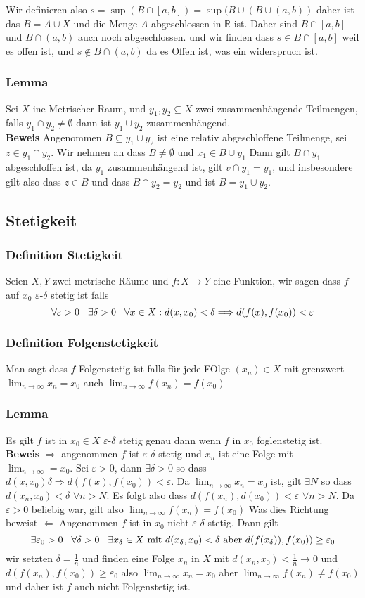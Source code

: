 \documentclass{article}
\newcommand{\smspc}{\hspace{0.3cm}}
\newcommand{\beweis}{\\\textbf{Beweis }}
\newcommand{\lemma}[1]{\subsubsection*{Lemma {#1}}}
\newcommand{\definition}[1]{\subsubsection*{Definition {#1}}}
\begin{document}
Wir definieren also $s=\sup(B\cap[a,b])=\sup(B\cup(B\cup(a,b))$ daher ist das $B=A\cup X$ und die Menge $A$ abgeschlossen in $\mathbb{R}$ ist. Daher sind $B\cap[a,b]$ und $B\cap (a,b)$ auch noch abgeschlossen. und wir finden dass $s\in B\cap [a,b]$ weil es offen ist, und $s\not\in B\cap(a,b)$ da es Offen ist, was ein widerspruch ist.
\lemma{} Sei $X$ ine Metrischer Raum, und $y_1,y_2\subseteq X$ zwei zusammenhängende Teilmengen, falls $y_1\cap y_2\neq\emptyset$ dann ist $y_1\cup y_2$ zusammenhängend.
\beweis Angenommen $B\subseteq y_1\cup y_2$ ist eine relativ abgeschloffene Teilmenge, sei $z\in y_1\cap y_2$. Wir nehmen an dass $B\neq \emptyset$ und $x_1\in B\cup y_1$ Dann gilt $B\cap y_1$ abgeschloffen ist, da $y_1$ zusammenhängend ist, gilt $v\cap y_1=y_1$, und insbesondere gilt also dass $z\in B$ und dass $B\cap y_2=y_2$ und ist $B=y_1\cup y_2$.
\subsection*{Stetigkeit}
\definition{Stetigkeit} Seien $X,Y$ zwei metrische Räume und $f:X\rightarrow Y$ eine Funktion, wir sagen dass $f$ auf $x_0$ $\varepsilon$-$\delta$ stetig ist falls \[\forall \varepsilon >0\smspc\exists \delta > 0\smspc\forall x\in X:d(x,x_0)<\delta\Longrightarrow d(f(x),f(x_0))<\varepsilon\]
\definition{Folgenstetigkeit} Man sagt dass $f$ Folgenstetig ist falls für jede FOlge $(x_n)\in X$ mit grenzwert $\lim_{n\rightarrow \infty} x_n=x_0$ auch $\lim_{n\rightarrow \infty} f(x_n)=f(x_0)$
\lemma{} Es gilt $f$ ist in $x_0\in X$ $\varepsilon$-$\delta$ stetig genau dann wenn $f$ in $x_0$ foglenstetig ist.
\beweis $\Longrightarrow$ angenommen $f$ ist $\varepsilon$-$\delta$ stetig und $x_n$ ist eine Folge mit $\lim_{n\rightarrow\infty}=x_0$. Sei $\varepsilon>0$, dann $\exists\delta >0$ so dass $d(x,x_0)\delta\Rightarrow d(f(x),f(x_0))<\varepsilon$. Da $\lim_{n\rightarrow\infty}x_n=x_0$ ist, gilt $\exists N$ so dass $d(x_n,x_0)<\delta$ $\forall n>N$. Es folgt also dass $d(f(x_n),d(x_0))< \varepsilon$ $\forall n>N$. Da $\varepsilon > 0$ beliebig war, gilt also $\lim_{n\rightarrow\infty}f(x_n)=f(x_0)$ Was dies Richtung beweist\newline
$\Longleftarrow$ Angenommen $f$ ist in $x_0$ nicht $\varepsilon$-$\delta$ stetig. Dann gilt \[\exists\varepsilon_0 >0\smspc\forall \delta >0\smspc \exists x_\delta \in X\text{ mit } d(x_\delta,x_0)<\delta\text{ aber } d(f(x_\delta)),f(x_0))\ge \varepsilon_0\]
wir setzten $\delta=\frac{1}{n}$ und finden eine Folge $x_n$ in $X$ mit $d(x_n,x_0)<\frac{1}{n}\rightarrow 0$ und $d(f(x_n),f(x_0))\ge\varepsilon_0$ also $\lim_{n\rightarrow\infty}x_n=x_0$ aber $\lim_{n\rightarrow \infty}f(x_n)\neq f(x_0)$ und daher ist $f$ auch nicht Folgenstetig ist.
\end{document}
